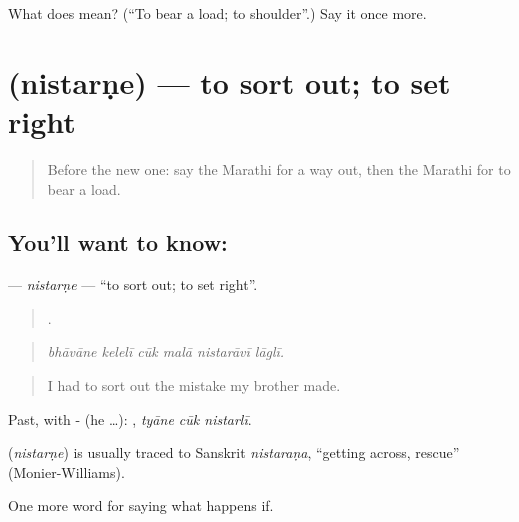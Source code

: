 \begin{tcolorbox}[breakable,colback=teal!4,colframe=teal!35!black,title={Before you move on}]
What does  mean? (\textquotedblleft{}To bear a load; to shoulder\textquotedblright{}.) Say it once more.
\end{tcolorbox}
\section[\texorpdfstring{\mr{निस्तरणे} (nistarṇe)}{निस्तरणे (nistarṇe)}]{ (nistarṇe) — to sort out; to set right}

\label{lesson:MR-C548-nistarne}



\begin{quote}
Before the new one: say the Marathi for a way out, then the Marathi for to bear a load.
\end{quote}

\subsection*{You'll want to know: }
\textbf{} — \emph{nistarṇe} — \textquotedblleft{}to sort out; to set right\textquotedblright{}.

\begin{quote}
     .
\end{quote}

\begin{quote}
\emph{bhāvāne kelelī cūk malā nistarāvī lāglī.}
\end{quote}

\begin{quote}
I had to sort out the mistake my brother made.
\end{quote}

Past, with - (he …):   , \emph{tyāne cūk nistarlī}.

\begin{cousinweb}
\textbf{} (\emph{nistarṇe}) is usually traced to Sanskrit \emph{nistaraṇa}, \textquotedblleft{}getting across, rescue\textquotedblright{} (Monier-Williams).
\end{cousinweb}

\begin{grammarlens}[title={What you've built}]
One more word for saying what happens if.
\end{grammarlens}

